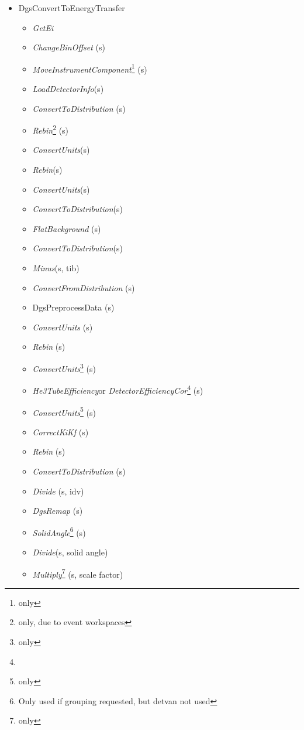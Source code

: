 \begin{itemize}
\item DgsConvertToEnergyTransfer
\begin{itemize}
\item \textit{GetEi}
\item \textit{ChangeBinOffset} (s)
\item \textit{MoveInstrumentComponent}\footnote{\isis{} only} (s)
\item \textit{LoadDetectorInfo}\footnotemark[\value{footnote}] (s)
\item \textit{ConvertToDistribution} (s)
\item \textit{Rebin}\footnote{\sns{} only, due to event workspaces} (s)
\item \textit{ConvertUnits}\footnotemark[\value{footnote}] (s)
\item \textit{Rebin}\footnotemark[\value{footnote}] (s)
\item \textit{ConvertUnits}\footnotemark[\value{footnote}] (s)
\item \textit{ConvertToDistribution}\footnotemark[\value{footnote}] (s)
\item \textit{FlatBackground} (s)
\item \textit{ConvertToDistribution}\footnotemark[\value{footnote}] (s)
\item \textit{Minus}\footnotemark[\value{footnote}] (s, tib)
\item \textit{ConvertFromDistribution} (s)
\item DgsPreprocessData (s)
\item \textit{ConvertUnits} (s)
\item \textit{Rebin} (s)
\item \textit{ConvertUnits}\footnote{\sns{} only} (s)
\item \textit{He3TubeEfficiency}\footnotemark[\value{footnote}] or \textit{DetectorEfficiencyCor}\footnote{\isis{}} (s)
\item \textit{ConvertUnits}\footnote{\sns{} only} (s)
\item \textit{CorrectKiKf} (s)
\item \textit{Rebin} (s)
\item \textit{ConvertToDistribution} (s)
\item \textit{Divide} (s, idv)
\item \textit{DgsRemap} (s)
\item \textit{SolidAngle}\footnote{Only used if grouping requested, but detvan not used} (s)
\item \textit{Divide}\footnotemark[\value{footnote}] (s, solid angle)
\item \textit{Multiply}\footnote{\isis{} only} (s, scale factor)
\end{itemize}
\end{itemize}


